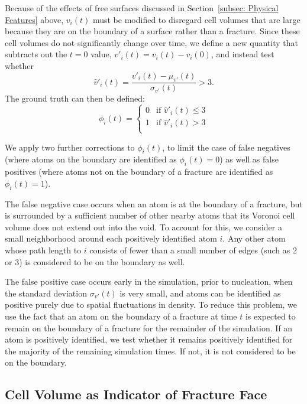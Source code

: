 Because of the effects of free surfaces discussed in Section~\ref{subsec: Physical Features} above, $v_i(t)$ must be modified to disregard cell volumes that are large because they are on the boundary of a surface rather than a fracture.  Since these cell volumes do not significantly change over time, we define a new quantity that subtracts out the $t=0$ value, $v'_i(t) = v_i(t)-v_i(0)$, and instead test whether
\begin{equation}
    \label{eqn: cell volume}
    \hat{v}'_i(t) = \frac{v'_i(t) - \mu_{v'}(t)}{\sigma_{v'}(t)} > 3.
\end{equation}
The ground truth can then be defined:
\begin{equation}
    \label{eqn: ground truth}
    \phi_i(t) = \begin{cases}
      0 & \text{if }\hat{v}'_i(t) \le 3 \\
      1 & \text{if }\hat{v}'_i(t) > 3 \\
    \end{cases} 
\end{equation}

We apply two further corrections to $\phi_i(t)$, to limit the case of false negatives (where atoms on the boundary are identified as $\phi_i(t)=0$) as well as false positives (where atoms not on the boundary of a fracture are identified as $\phi_i(t)=1$).

The false negative case occurs when an atom is at the boundary of a fracture, but is surrounded by a sufficient number of other nearby atoms that its Voronoi cell volume does not extend out into the void.  To account for this, we consider a small neighborhood around each positively identified atom $i$.  Any other atom whose path length to $i$ consists of fewer than a small number of edges (such as 2 or 3) is considered to be on the boundary as well.

The false positive case occurs early in the simulation, prior to nucleation, when the standard deviation $\sigma_{v'}(t)$ is very small, and atoms can be identified as positive purely due to spatial fluctuations in density.  To reduce this problem, we use the fact that an atom on the boundary of a fracture at time $t$ is expected to remain on the boundary of a fracture for the remainder of the simulation.  If an atom is positively identified, we test whether it remains positively identified for the majority of the remaining simulation times.  If not, it is not considered to be on the boundary.

\subsection{Cell Volume as Indicator of Fracture Face}

